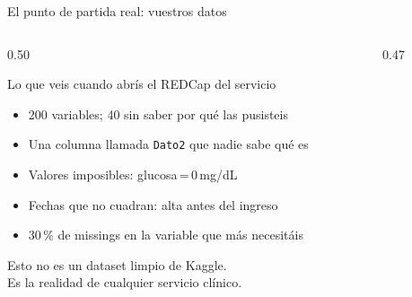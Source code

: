 \documentclass[aspectratio=169,10pt]{beamer}
\begin{document}
\begin{frame}{El punto de partida real: vuestros datos}
  \begin{columns}[T]
    \begin{column}{0.50\textwidth}
      \begin{block}{Lo que veis cuando abrís el REDCap del servicio}
        \begin{itemize}\small
          \item 200 variables; 40 sin saber por qué las pusisteis
          \item Una columna llamada \texttt{Dato2} que nadie sabe qué es
          \item Valores imposibles: glucosa\,=\,0\,mg/dL
          \item Fechas que no cuadran: alta antes del ingreso
          \item 30\,\% de missings en la variable que más necesitáis
        \end{itemize}
      \end{block}
      \vspace{3mm}
      \begin{block}{}
        \scriptsize Esto no es un dataset limpio de Kaggle.\\
        Es la realidad de cualquier servicio clínico.
      \end{block}
    \end{column}
    \begin{column}{0.47\textwidth}
      \centering\vspace{2mm}
\end{column}
\end{columns}
\end{frame}
\end{document}
